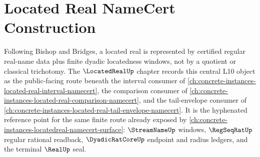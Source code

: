 \chapter{Located Real NameCert Construction}
\label{ch:concrete-instances-located-real-namecert}

Following Bishop and Bridges, a located real is represented by certified regular real-name data plus finite dyadic locatedness windows, not by a quotient or classical trichotomy. The $\LocatedRealUp$ chapter records this central L10 object as the public-facing route beneath the interval consumer of \autoref{ch:concrete-instances-located-real-interval-namecert}, the comparison consumer of \autoref{ch:concrete-instances-located-real-comparison-namecert}, and the tail-envelope consumer of \autoref{ch:concrete-instances-located-real-tail-envelope-namecert}. It is the hyphenated reference point for the same finite route already exposed by \autoref{ch:concrete-instances-locatedreal-namecert-surface}: $\StreamNameUp$ windows, $\RegSeqRatUp$ regular rational readback, $\DyadicRatCoreUp$ endpoint and radius ledgers, and the terminal $\RealUp$ seal.

